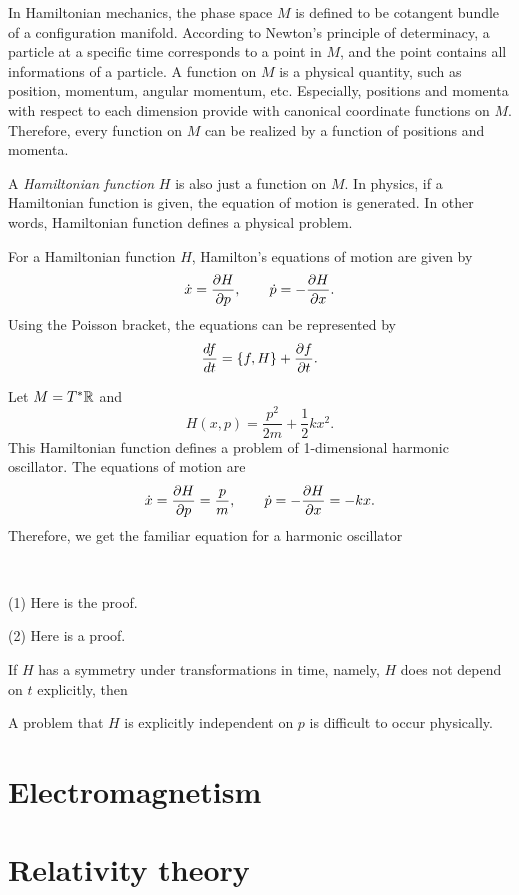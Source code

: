 \documentclass{../prb}
\begin{document}
\clearpage
In Hamiltonian mechanics, the phase space $M$ is defined to be cotangent bundle of a configuration manifold.
According to Newton's principle of determinacy, a particle at a specific time corresponds to a point in $M$, and the point contains all informations of a particle.
A function on $M$ is a physical quantity, such as position, momentum, angular momentum, etc.
Especially, positions and momenta with respect to each dimension provide with canonical coordinate functions on $M$.
Therefore, every function on $M$ can be realized by a function of positions and momenta.

A \emph{Hamiltonian function} $H$ is also just a function on $M$.
In physics, if a Hamiltonian function is given, the equation of motion is generated.
In other words, Hamiltonian function defines a physical problem.

\begin{defn}
For a Hamiltonian function $H$, Hamilton's equations of motion are given by
\[\dot x=\pd{H}{p},\qquad\dot p=-\pd{H}{x}.\]
Using the Poisson bracket, the equations can be represented by
\[\dd{f}{t} = \{f,H\} + \pd{f}{t}.\]
\end{defn}

\begin{prb}
Let $M=T^*\mathbb{R}$ and
\[H(x,p)=\frac{p^2}{2m}+\frac12kx^2.\]
This Hamiltonian function defines a problem of 1-dimensional harmonic oscillator.
The equations of motion are
\[\dot x=\pd{H}{p}=\frac pm,\qquad\dot p=-\pd{H}{x}=-kx.\]
Therefore, we get the familiar equation for a harmonic oscillator
\end{prb}
\begin{sol}\ \par
(1) Here is the proof.

(2) Here is a proof.
\end{sol}


If $H$ has a symmetry under transformations in time, namely, $H$ does not depend on $t$ explicitly, then 

A problem that $H$ is explicitly independent on $p$ is difficult to occur physically.

\chapter{Electromagnetism}

\chapter{Relativity theory}
\end{document}
